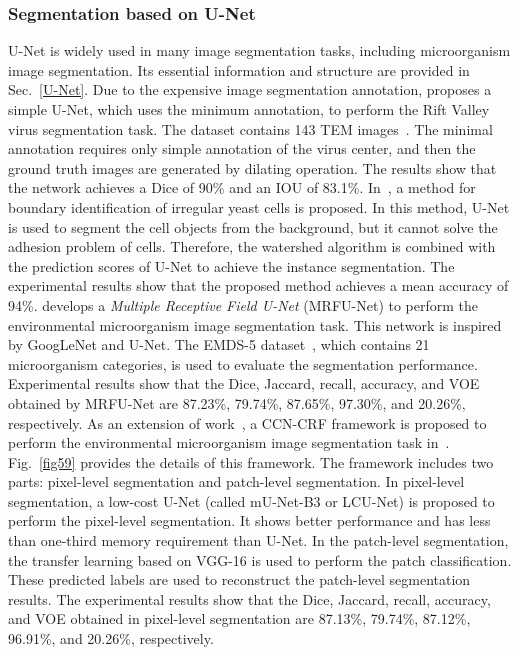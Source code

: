 \subsubsection{Segmentation based on U-Net}
U-Net is widely used in many image segmentation tasks, including microorganism image segmentation. Its essential information and structure are provided in Sec.~\ref{U-Net}. Due to the expensive image segmentation annotation, \cite{Matuszewski-2018-MATS} proposes a simple U-Net, which uses the minimum annotation, to perform the Rift Valley virus segmentation task. The dataset contains 143 TEM images~\cite{Kylberg-2012-SVPC}. The minimal annotation requires only simple annotation of the virus center, and then the ground truth images are generated by dilating operation. The results show that the network achieves a Dice of 90\% and an IOU of 83.1\%. In~\cite{Dietler-2020-ACNN}, a method for boundary identification of irregular yeast cells is proposed. In this method, U-Net is used to segment the cell objects from the background, but it cannot solve the adhesion problem of cells. Therefore, the watershed algorithm is combined with the prediction scores of U-Net to achieve the instance segmentation. The experimental results show that the proposed method achieves a mean accuracy of 94\%. \cite{Li-2020-MAMR} develops a \emph{Multiple Receptive Field U-Net} (MRFU-Net) to perform the environmental microorganism image segmentation task. This network is inspired by GoogLeNet and U-Net. The EMDS-5 dataset~\cite{Li-2020-ANMD,Li-2021-EMDS,Kulwa-2022-ANPD}, which contains 21 microorganism categories, is used to evaluate the segmentation performance. Experimental results show that the Dice, Jaccard, recall, accuracy, and VOE obtained by MRFU-Net are 87.23\%, 79.74\%, 87.65\%, 97.30\%, and 20.26\%, respectively. As an extension of work~\cite{Li-2020-MAMR}, a CCN-CRF framework is proposed to perform the environmental microorganism image segmentation task in~\cite{Zhang-2020-AMCF}. Fig.~\ref{fig59} provides the details of this framework. The framework includes two parts: pixel-level segmentation and patch-level segmentation. In pixel-level segmentation, a low-cost U-Net (called mU-Net-B3 or LCU-Net) is proposed to perform the pixel-level segmentation. It shows better performance and has less than one-third memory requirement than U-Net. In the patch-level segmentation, the transfer learning based on VGG-16 is used to perform the patch classification. These predicted labels are used to reconstruct the patch-level segmentation results. The experimental results show that the Dice, Jaccard, recall, accuracy, and VOE obtained in pixel-level segmentation are 87.13\%, 79.74\%, 87.12\%, 96.91\%, and 20.26\%, respectively.



